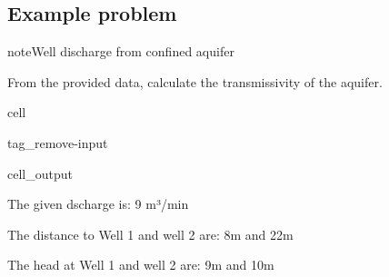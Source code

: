 \documentclass[letterpaper,10pt,english]{jupyterBook}
\begin{document}
\subsection{Example problem}
\label{\detokenize{content/flow/L8/18_wells:id2}}
\begin{sphinxadmonition}{note}{Well discharge from confined aquifer}

\sphinxAtStartPar
From the provided data, calculate the transmissivity of the aquifer.
\end{sphinxadmonition}

\begin{sphinxuseclass}{cell}
\begin{sphinxuseclass}{tag_remove-input}\begin{sphinxVerbatimOutput}

\begin{sphinxuseclass}{cell_output}
\begin{sphinxVerbatim}[commandchars=\\\{\}]

 The given dscharge is: 9 m³/min 

 The distance to Well 1 and well 2 are: 8m and 22m  

 The head at Well 1 and well 2 are: 9m and 10m
\end{sphinxVerbatim}

\end{sphinxuseclass}\end{sphinxVerbatimOutput}

\end{sphinxuseclass}
\end{sphinxuseclass}
\end{document}
